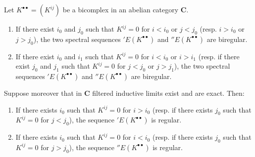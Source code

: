 \begin{proposition}[11.3.3]
\label{0.11.3.3}
Let $K^{\bullet\bullet}=(K^{ij})$ be a bicomplex in an abelian category
$\boldsymbol{C}$.
\begin{enumerate}
  \item[\textup{(i)}] If there exist $i_0$ and $j_0$ such that $K^{ij}=0$ for $i<i_0$ or
    $j<j_0$ \textup{(resp.} $i>i_0$ or $j>j_0$), the two spectral sequences
    $'E(K^{\bullet\bullet})$ and $''E(K^{\bullet\bullet})$ are
    biregular.
  \item[\textup{(ii)}] If there exist $i_0$ and $i_1$ such that $K^{ij}=0$ for $i<i_0$ or
    $i>i_1$ \textup{(resp.} if there exist $j_0$ and $j_1$ such that $K^{ij}=0$ for
    $j<j_0$ or $j>j_1$), the two spectral sequences
    $'E(K^{\bullet\bullet})$ and $''E(K^{\bullet\bullet})$ are
    biregular.
\end{enumerate}
Suppose moreover that in $\boldsymbol{C}$ filtered inductive limits
exist and are exact. Then:
\begin{enumerate}
  \item[\textup{(iii)}] If there exists $i_0$ such that $K^{ij}=0$ for $i>i_0$ \textup{(resp.} if
    there exists $j_0$ such that $K^{ij}=0$ for $j<j_0$), the sequence
    $'E(K^{\bullet\bullet})$ is regular.
  \item[\textup{(iv)}] If there exists $i_0$ such that $K^{ij}=0$ for $i<i_0$ \textup{(resp.} if
    there exists $j_0$ such that $K^{ij}=0$ for $j>j_0$), the sequence
    $''E(K^{\bullet\bullet})$ is regular.
\end{enumerate}
\end{proposition}

